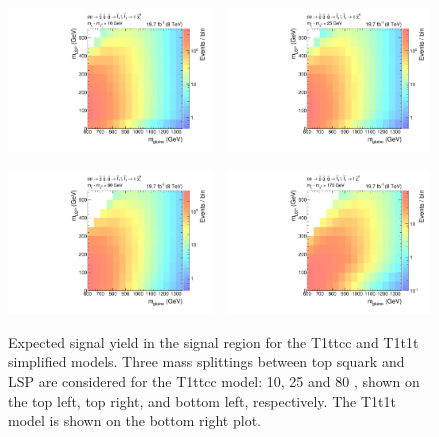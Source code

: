 \begin{figure}[htbp]
 \centering
 \includegraphics[width=0.48\textwidth]
 {figures/razor_interpretation/events_T1ttcc_DM-10_g1Mbg1W0Ll_mdPhig0p5}
~
 \includegraphics[width=0.48\textwidth]
 {figures/razor_interpretation/events_T1ttcc_DM-25_g1Mbg1W0Ll_mdPhig0p5} 

\includegraphics[width=0.48\textwidth]
{figures/razor_interpretation/events_T1ttcc_DM-80_g1Mbg1W0Ll_mdPhig0p5} 
~
\includegraphics[width=0.48\textwidth]
{figures/razor_interpretation/events_T1t1t_g1Mbg1W0Ll_mdPhig0p5} 
\caption{Expected signal yield in the signal region for the T1ttcc and T1t1t simplified
models. Three mass splittings between top squark and LSP are considered for the T1ttcc model: 10, 25
and 80 \GeV, shown on the top left, top right, and bottom left, respectively. The T1t1t model is
shown on the bottom right plot. 
 \label{fig:events_T1ttcc_T1t1t}}
\end{figure}

